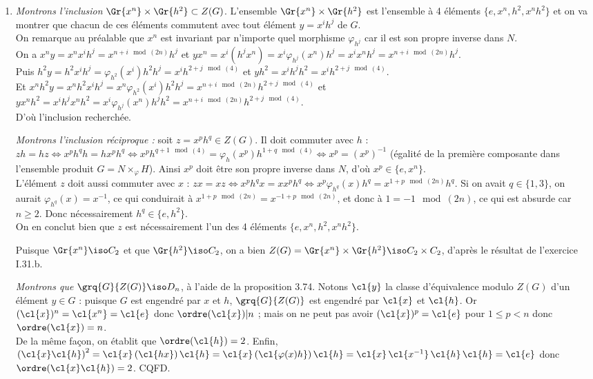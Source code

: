 \begin{enumerate}[resume]\itemsep 0.1cm
    \item \emph{Montrons l'inclusion} $\Gr{x^n}\times \Gr{h^2} \subset Z(G)$. L'ensemble $\Gr{x^n}\times \Gr{h^2}$ est l'ensemble à 4 éléments $\{e, x^n, h^2, x^nh^2\}$ et on va montrer que chacun de ces éléments commutent avec tout élément $y=x^ih^j$ de $G$.\\
    On remarque au préalable que $x^n$ est invariant par n'importe quel morphisme $\varphi_{h^j}$ car il est son propre inverse dans $N$.\\
    On a $x^n y = x^n x^i h^j = x^{n+i \mod(2n)} h^j$ et $yx^n = x^i (h^j x^n) = x^i \varphi_{h^j}(x^n) h^j = x^ix^n h^j = x^{n+i \mod(2n)} h^j$.\\
    Puis $h^2 y = h^2 x^i h^j = \varphi_{h^2}(x^i)h^2h^j = x^i h^{2+j \mod(4)}$ et $yh^2 = x^ih^jh^2 = x^i h^{2+j \mod(4)}$.\\
    Et $x^nh^2 y = x^nh^2x^ih^j = x^n \varphi_{h^2}(x^i)h^2h^j = x^{n+i \mod(2n)} h^{2+j \mod(4)}$ et $yx^nh^2 = x^ih^jx^nh^2 =  x^i \varphi_{h^j}(x^n) h^jh^2 =  x^{n+i \mod(2n)} h^{2+j \mod(4)}$.\\
    D'où l'inclusion recherchée.\smallskip

    \emph{Montrons l'inclusion réciproque :} soit $z=x^ph^q \in Z(G)$. Il doit commuter avec $h$ : $zh = hz \iff x^ph^q h = h x^p h^q \iff x^p h^{q+1 \mod(4)} = \varphi_{h}(x^p) h^{1+q \mod(4)} \iff x^p = (x^p)^{-1}$ (égalité de la première composante dans l'ensemble produit $G=  N \times_{\varphi} H$).
    Ainsi $x^p$ doit être son propre inverse dans $N$, d'où $x^p \in \{e, x^n\}$.\\
    L'élément $z$ doit aussi commuter avec $x$ : $zx = xz \iff x^ph^q x = x x^p h^q \iff x^p \varphi_{h^q}(x) h^q = x^{1+p \mod(2n)} h^q$. Si on avait $q\in \{1,3\}$, on aurait $\varphi_{h^q}(x) = x^{-1}$, ce qui conduirait à $x^{1+p \mod(2n)} = x^{-1+p \mod(2n)}$, et donc à $1 = -1 \mod(2n)$, ce qui est absurde car $n\geq 2$.
    Donc nécessairement $h^q \in \{e, h^2\}$.\\
    On en conclut bien que $z$ est nécessairement l'un des 4 éléments $\{e, x^n, h^2, x^nh^2\}$.\smallskip

    Puisque $\Gr{x^n}\iso C_2$ et que $\Gr{h^2} \iso C_2$, on a bien $Z(G) = \Gr{x^n}\times \Gr{h^2}  \iso C_2 \times C_2$, d'après le résultat de l'exercice I.31.b.\smallskip

    \emph{Montrons que } $\grq{G}{Z(G)} \iso D_n$, à l'aide de la proposition 3.74. Notons $\cl{y}$ la classe d'équivalence modulo $Z(G)$ d'un élément $y\in G$ : puisque $G$ est engendré par $x$ et $h$, 
    $\grq{G}{Z(G)}$ est engendré par $\cl{x}$ et $\cl{h}$. Or $(\cl{x})^n = \cl{x^n} = \cl{e}$ donc $\ordre(\cl{x}) | n$ ; mais on ne peut pas avoir $(\cl{x})^p= \cl{e}$ pour $1\leq p < n$ donc $\ordre(\cl{x}) = n$.\\
    De la même façon, on établit que $\ordre(\cl{h}) = 2$. Enfin, $\left(\cl{x}\cl{h} \right)^2 = \cl{x}\left(\cl{hx}\right)\cl{h}= \cl{x}\left(\cl{\varphi(x)h}\right)\cl{h} =\cl{x}\, \cl{x^{-1}}\,  \cl{h}\,\cl{h} = \cl{e}$ donc $\ordre(\cl{x}\cl{h}) = 2$. CQFD.
   

\end{enumerate}
